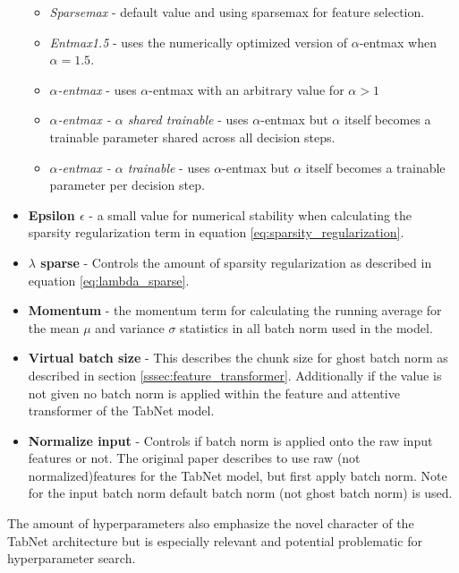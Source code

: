 \documentclass[../main.tex]{subfiles}
\begin{document}
\begin{itemize}
	\begin{itemize}
		\item \emph{Sparsemax} - default value and using sparsemax for feature selection.		
		\item \emph{Entmax1.5} - uses the numerically optimized version of $\alpha$-entmax when $\alpha=1.5$.
		\item \emph{$\alpha$-entmax} - uses $\alpha$-entmax with an arbitrary value for $\alpha>1$
		\item \emph{$\alpha$-entmax - $\alpha$ shared trainable} - uses $\alpha$-entmax but $\alpha$ itself becomes a trainable parameter shared across all decision steps.
		\item \emph{$\alpha$-entmax - $\alpha$ trainable} - uses $\alpha$-entmax but $\alpha$ itself becomes a trainable parameter per decision step.				
	\end{itemize}
	
	\item \textbf{Epsilon $\epsilon$} - a small value for numerical stability when calculating the sparsity regularization term in equation \ref{eq:sparsity_regularization}.

	\item \textbf{$\lambda$ sparse} - Controls the amount of sparsity regularization as described in equation \ref{eq:lambda_sparse}.

	\item \textbf{Momentum} - the momentum term for calculating the running average for the mean $\mu$ and variance $\sigma$ statistics in all batch norm used in the model.

	\item \textbf{Virtual batch size} - This describes the chunk size for ghost batch norm as described in section \ref{sssec:feature_transformer}. Additionally if the value is not given no batch norm is applied within the feature and attentive transformer of the TabNet model.

	\item \textbf{Normalize input} - Controls if batch norm is applied onto the raw input features or not. The original paper describes to use raw (not normalized)features for the TabNet model, but first apply batch norm. Note for the input batch norm default batch norm (not ghost batch norm) is used. 
\end{itemize}

The amount of hyperparameters also emphasize the novel character of the TabNet architecture but is especially relevant and potential problematic for hyperparameter search.
\end{document}
